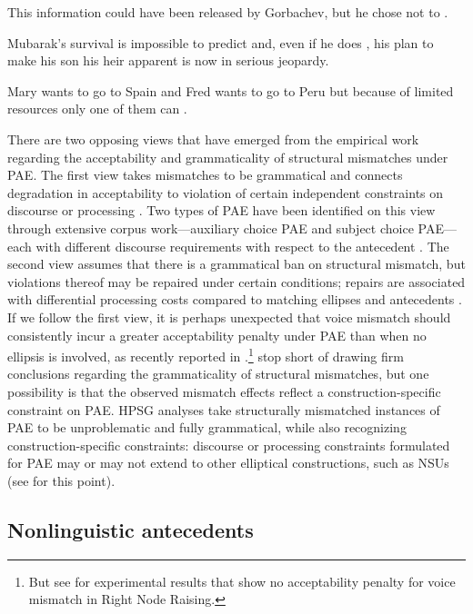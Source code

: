 \eal

\ex This information could have been released by Gorbachev, but he chose not to \jbtr. \citep[37]{Hardt1993} \label{27}

\ex Mubarak's survival is impossible to predict and, even if he does \jbtr, his plan to make his son his heir apparent is now in serious jeopardy. \citep[7]{Miller2014a} \label{28}

\ex Mary wants to go to Spain and Fred wants to go to Peru but because of limited resources only one of them can \jbtr. \citep[128]{Webber79a} \label{29}
\zl

There are two opposing views that have emerged from the empirical work regarding the acceptability and grammaticality of structural mismatches under PAE. The first view takes mismatches to be grammatical and connects degradation in acceptability to violation of certain independent constraints on discourse \citep{Kehler2002, Miller2011, %
Miller2014, Miller2014a, Miller2014b} or processing \citep{Kim2011}. Two types of PAE have been identified on this view through extensive corpus work---auxiliary choice PAE and subject choice PAE---each with different discourse requirements with respect to the antecedent \citep{Miller2011, Miller2014a, Miller2014b}. The second view assumes that there is a grammatical ban on structural mismatch, but violations thereof may be repaired under certain conditions; repairs are associated with differential processing costs compared to matching ellipses and antecedents \citep{Arregui2006, Grant2012}. If we follow the first view, it is perhaps unexpected that voice mismatch should consistently incur a greater acceptability penalty under PAE than when no ellipsis is involved, as recently reported in \citet{Kim2018}.\footnote{But see \citet{Abeille2016} for experimental results
that show no acceptability penalty for voice mismatch in  Right Node Raising.} \citet{Kim2018} stop short of drawing firm conclusions regarding the grammaticality of structural mismatches, but one possibility is that the observed mismatch effects reflect a construction-specific constraint on PAE. HPSG analyses take structurally mismatched instances of PAE to be unproblematic and fully grammatical, while also recognizing construction-specific constraints: discourse or processing constraints formulated for PAE may or may not extend to other elliptical constructions, such as NSUs (see \citealt{Abeille2016,Ginzburg2018} for this point).


\subsection{Nonlinguistic antecedents}
\label{sec-nonlinguistic-antecedents}


